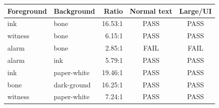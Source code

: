 \begin{tabularx}{\linewidth}{@{}l l r c c@{}}
\toprule
Foreground & Background & Ratio & Normal text & Large/UI \\
\midrule
ink & bone & 16.53:1 & PASS & PASS \\
witness & bone & 6.15:1 & PASS & PASS \\
alarm & bone & 2.85:1 & FAIL & FAIL \\
alarm & ink & 5.79:1 & PASS & PASS \\
ink & paper-white & 19.46:1 & PASS & PASS \\
bone & dark-ground & 16.25:1 & PASS & PASS \\
witness & paper-white & 7.24:1 & PASS & PASS \\
\bottomrule
\end{tabularx}
